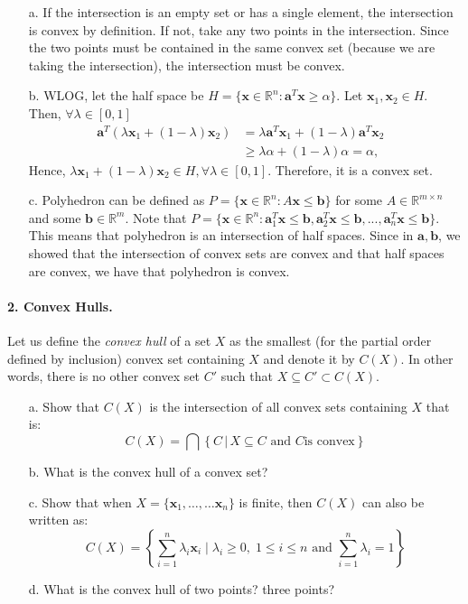 \documentclass[11pt]{article}
\newcommand{\bx}{\mathbf{x}}
\newcommand{\ba}{\mathbf{a}}
\begin{document}
\color{blue}
\begin{itemize}
\item [a.] If the intersection is an empty set or has a single element, the intersection is convex by definition. If not, take any two points in the intersection. Since the two points must be contained in the same convex set (because we are taking the intersection), the intersection must be convex.
\item [b.] WLOG, let the half space be $H=\{\bx \in \mathbb{R}^n: \ba^T \bx \geq \alpha\}$. Let $\bx_1,\bx_2 \in H$. Then, $\forall \lambda \in [0,1]$
\begin{align*}
\ba^T(\lambda \bx_1 + (1-\lambda) \bx_2) &= \lambda \ba^T \bx_1 + (1 - \lambda) \ba^T \bx_2 &\\
& \geq \lambda \alpha + (1 - \lambda) \alpha = \alpha, 
\end{align*}
Hence, $\lambda \bx_1 + (1-\lambda) \bx_2 \in H, \forall \lambda \in [0,1]$. Therefore, it is a convex set.
\item [c.] Polyhedron can be defined as $P=\{\bx \in \mathbb{R}^n: A\bx \leq \textbf{b} \}$ for some $A\in \mathbb{R}^{m\times n}$ and some $\textbf{b} \in \mathbb{R}^m$.
Note that $P=\{\bx \in \mathbb{R}^n: \ba_1^T \bx \leq \textbf{b}, \ba_2^T \bx \leq \textbf{b}, ..., \ba_n^T \bx \leq \textbf{b} \}$.
This means that polyhedron is an intersection of half spaces. Since in $\ba,\textbf{b}$, we showed that the intersection of convex sets are convex and that half spaces are convex, we have that polyhedron is convex.
\end{itemize}
\color{black}

\paragraph{2. Convex Hulls.}

Let us define the \emph{convex hull} of a set $X$ as the smallest (for the
partial order defined by inclusion) convex set containing $X$ and denote it by
$C(X)$. In other words, there is no other convex set $C'$ such that $X\subseteq
C'\subset C(X)$.

\begin{itemize}
    \item[a.]  Show that $C(X)$ is the intersection of all convex sets
        containing $X$ that is:
        \begin{displaymath}
            C(X) = \bigcap \left \{ C \,|\, X\subseteq C \text{ and } C \text{
            is convex}\right\}
        \end{displaymath}
    \item[b.] What is the convex hull of a convex set?
    \item[c.]
        Show that when $X = \{\bx_1,\ldots,\ldots \bx_n\}$ is finite, then
        $C(X)$ can also be written as: \begin{displaymath} C(X)
            = \left\{\sum_{i=1}^n \lambda_i \bx_i\;|\;\lambda_i\geq 0,\;1\leq
            i\leq n\text{ and } \sum_{i=1}^n \lambda_i=1\right\}
        \end{displaymath}
    \item [d.] What is the convex hull of two points? three points?
\end{itemize}
\end{document}
